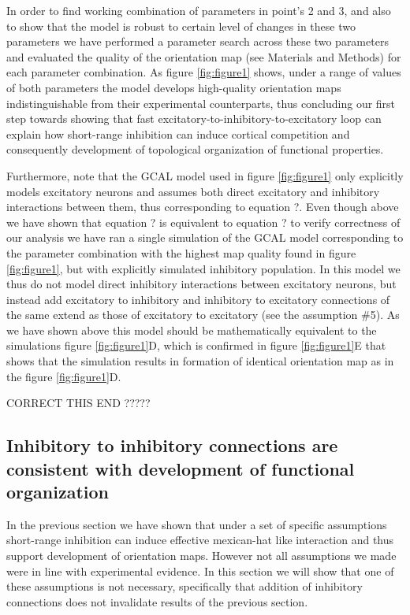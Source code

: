 \documentclass[a4paper,10pt]{article}
\begin{document}
In order to find working combination of parameters in point's 2 and 3, and also to show that the model is robust to certain level of changes
in these two parameters we have performed a parameter search across these two parameters and evaluated the quality of the orientation map (see Materials and Methods) for each 
parameter combination. As figure \ref{fig:figure1} shows, under a range of values of both parameters the model develops high-quality orientation maps indistinguishable
from their experimental counterparts, thus concluding our first step towards showing that fast excitatory-to-inhibitory-to-excitatory loop can explain 
how short-range inhibition can induce cortical competition and consequently development of topological organization of functional properties.

Furthermore, note that the GCAL model used in figure \ref{fig:figure1} only explicitly models excitatory neurons and assumes both direct excitatory and inhibitory
interactions between them, thus corresponding to equation ?. Even though above we have shown that equation ? is equivalent to equation ? to verify 
correctness of our analysis we have ran a single simulation of the GCAL model corresponding to the parameter combination with the highest map 
quality found in figure \ref{fig:figure1}, but with explicitly simulated inhibitory population. In this model we thus do not model direct inhibitory interactions
between excitatory neurons, but instead add excitatory to inhibitory and inhibitory to excitatory connections of the same extend as those of 
excitatory to excitatory (see the assumption \#5). As we have shown above this model should be mathematically equivalent to the simulations 
figure \ref{fig:figure1}D, which is confirmed in figure \ref{fig:figure1}E that shows that the simulation results in formation of identical orientation map as in the figure \ref{fig:figure1}D.

CORRECT THIS END ?????


\subsection{Inhibitory to inhibitory connections are consistent with development of functional organization} \label{sec:SM2}

In the previous section we have shown that under a set of specific assumptions short-range inhibition can induce 
effective mexican-hat like interaction and thus support development of orientation maps. However not all assumptions we 
made were in line with experimental evidence. In this section we will show that one of these assumptions is not necessary, 
specifically that addition of inhibitory connections does not invalidate results of the previous section. 
\end{document}
